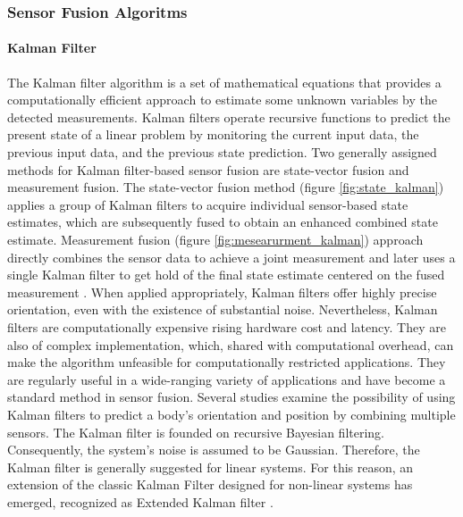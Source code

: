 \subsubsection{Sensor Fusion Algoritms}
\paragraph{Kalman Filter}

The Kalman filter algorithm is a set of mathematical equations that provides a computationally efficient approach to estimate some unknown variables by the detected measurements\cite{welch1995introduction}. Kalman filters operate recursive functions to predict the present state of a linear problem by monitoring the current input data, the previous input data, and the previous state prediction.  Two generally assigned methods for Kalman filter-based sensor fusion are state-vector fusion and measurement fusion. The state-vector fusion method (figure \ref{fig:state_kalman}) applies a group of Kalman filters to acquire individual sensor-based state estimates, which are subsequently fused to obtain an enhanced combined state estimate. Measurement fusion (figure \ref{fig:mesearurment_kalman}) approach directly combines the sensor data to achieve a joint measurement and later uses a single Kalman filter to get hold of the final state estimate centered on the fused measurement \cite{mosallaei2007process}.
When applied appropriately, Kalman filters offer highly precise orientation, even with the existence of substantial noise. Nevertheless, Kalman filters are computationally expensive rising hardware cost and latency. They are also of complex implementation, which, shared with computational overhead, can make the algorithm unfeasible for computationally restricted applications. They are regularly useful in a wide-ranging variety of applications and have become a standard method in sensor fusion. Several studies examine the possibility of using Kalman filters to predict a body’s orientation and position by combining multiple sensors. The Kalman filter is founded on recursive Bayesian filtering.
Consequently, the system’s noise is assumed to be Gaussian. Therefore, the Kalman filter is generally suggested for linear systems. For this reason, an extension of the classic Kalman Filter designed for non-linear systems has emerged, recognized as Extended Kalman filter \cite{wilson2019formulation}.


